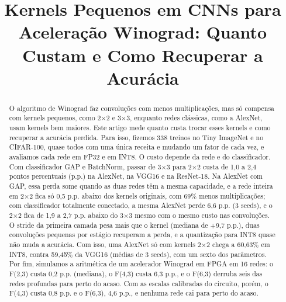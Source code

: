 \documentclass[conference]{IEEEtran}
\newcommand{\by}{\ensuremath{\times}}
\begin{document}
\title{Kernels Pequenos em CNNs para Aceleração Winograd: Quanto Custam e Como Recuperar a Acurácia}

\author{
\and
{}
}

\maketitle
\thispagestyle{plain}
\pagestyle{plain}

\begin{abstract}
O algoritmo de Winograd faz convoluções com menos multiplicações, mas só compensa com kernels pequenos, como 2\by2 e 3\by3, enquanto
redes clássicas, como a AlexNet, usam kernels bem maiores. Este artigo mede quanto custa trocar esses kernels e como recuperar a
acurácia perdida. Para isso, fizemos 338 treinos no Tiny ImageNet e no CIFAR-100, quase todos com uma única receita e mudando um fator
de cada vez, e avaliamos cada rede em FP32 e em INT8. O custo depende da rede e do classificador. Com classificador GAP e BatchNorm,
passar de 3\by3 para 2\by2 custa de 1,0 a 2,4 pontos percentuais (p.p.) na AlexNet, na VGG16 e na ResNet-18. Na AlexNet com GAP, essa
perda some quando as duas redes têm a mesma capacidade, e a rede inteira em 2\by2 fica só 0,5 p.p. abaixo dos kernels originais, com
69\% menos multiplicações; com classificador totalmente conectado, a mesma AlexNet perde 6,6 p.p. (3 seeds), e o 2\by2 fica de 1,9 a
2,7 p.p. abaixo do 3\by3 mesmo com o mesmo custo nas convoluções. O stride da primeira
camada pesa mais que o kernel (mediana de $+$9,7 p.p.), duas convoluções pequenas por estágio recuperam a perda, e a quantização para
INT8 quase não muda a acurácia. Com isso, uma AlexNet só com kernels 2\by2 chega a 60,63\% em INT8, contra 59,45\% da VGG16 (médias de
3 seeds), com um sexto dos parâmetros. Por fim, simulamos a aritmética de um acelerador Winograd em FPGA em 16 redes: o F(2,3) custa
0,2 p.p. (mediana), o F(4,3) custa 6,3 p.p., e o F(6,3) derruba seis das redes profundas para perto do acaso. Com as escalas calibradas
do circuito, porém, o F(4,3) custa 0,8 p.p. e o F(6,3), 4,6 p.p., e nenhuma rede cai para perto do acaso.
\end{abstract}
\end{document}
